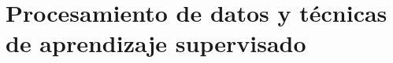 \documentclass{beamer}
\begin{document}
%	
%
%
%	


\section{Procesamiento de datos y técnicas  de aprendizaje supervisado}
\end{document}
